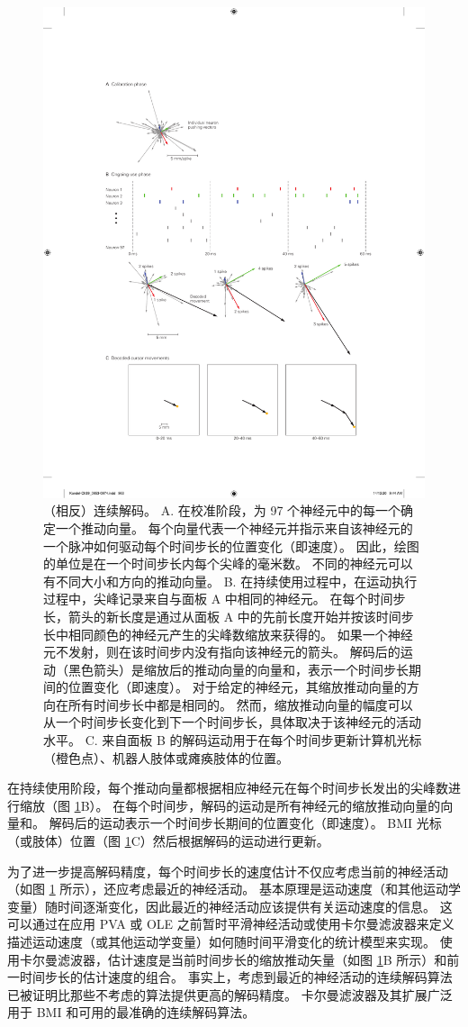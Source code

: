 \begin{figure}[htbp]
	\centering
	\includegraphics[width=0.5\linewidth]{chap39/fig_39_6}
	\caption{（相反）连续解码。 
		A. 在校准阶段，为 97 个神经元中的每一个确定一个推动向量。 
		每个向量代表一个神经元并指示来自该神经元的一个脉冲如何驱动每个时间步长的位置变化（即速度）。 
		因此，绘图的单位是在一个时间步长内每个尖峰的毫米数。 
		不同的神经元可以有不同大小和方向的推动向量。 
		B. 在持续使用过程中，在运动执行过程中，尖峰记录来自与面板 A 中相同的神经元。 
		在每个时间步长，箭头的新长度是通过从面板 A 中的先前长度开始并按该时间步长中相同颜色的神经元产生的尖峰数缩放来获得的。 
		如果一个神经元不发射，则在该时间步内没有指向该神经元的箭头。 
		解码后的运动（黑色箭头）是缩放后的推动向量的向量和，表示一个时间步长期间的位置变化（即速度）。 
		对于给定的神经元，其缩放推动向量的方向在所有时间步长中都是相同的。
		然而，缩放推动向量的幅度可以从一个时间步长变化到下一个时间步长，具体取决于该神经元的活动水平。 
		C. 来自面板 B 的解码运动用于在每个时间步更新计算机光标（橙色点）、机器人肢体或瘫痪肢体的位置。}
	\label{fig:39_6}
\end{figure}

在持续使用阶段，每个推动向量都根据相应神经元在每个时间步长发出的尖峰数进行缩放（图 \ref{fig:39_6}B）。 
在每个时间步，解码的运动是所有神经元的缩放推动向量的向量和。 
解码后的运动表示一个时间步长期间的位置变化（即速度）。 
BMI 光标（或肢体）位置（图 \ref{fig:39_6}C）然后根据解码的运动进行更新。


为了进一步提高解码精度，每个时间步长的速度估计不仅应考虑当前的神经活动（如图 \ref{fig:39_6} 所示），还应考虑最近的神经活动。 
基本原理是运动速度（和其他运动学变量）随时间逐渐变化，因此最近的神经活动应该提供有关运动速度的信息。 
这可以通过在应用 PVA 或 OLE 之前暂时平滑神经活动或使用卡尔曼滤波器来定义描述运动速度（或其他运动学变量）如何随时间平滑变化的统计模型来实现。 
使用卡尔曼滤波器，估计速度是当前时间步长的缩放推动矢量（如图 \ref{fig:39_6}B 所示）和前一时间步长的估计速度的组合。 
事实上，考虑到最近的神经活动的连续解码算法已被证明比那些不考虑的算法提供更高的解码精度。 
卡尔曼滤波器及其扩展广泛用于 BMI 和可用的最准确的连续解码算法。


